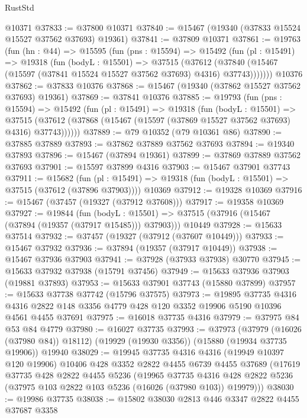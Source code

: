\begin{lexlean}{RustStd}
\begin{coremodule}
    @10371
@37833 := @37800 @10371
@37840 := @15467 (@19340 (@37833 @15524 @15527 @37562 @37693) @19361)
@37841 := @37809 @10371
@37861 := @19763
    (fun (hn : @44) =>
    @15595
      (fun (pns : @15594) =>
      @15492
        (fun (pl : @15491) =>
        @19318
          (fun (bodyL : @15501) =>
          @37515
            (@37612
              (@37840 (@15467 (@15597 (@37841 @15524 @15527 @37562 @37693) @4316) @37743)))))))
    @10376
@37862 := @37833 @10376
@37868 := @15467 (@19340 (@37862 @15527 @37562 @37693) @19361)
@37869 := @37841 @10376
@37885 := @19793
    (fun (pns : @15594) =>
    @15492
      (fun (pl : @15491) =>
      @19318
        (fun (bodyL : @15501) =>
        @37515 (@37612 (@37868 (@15467 (@15597 (@37869 @15527 @37562 @37693) @4316) @37743))))))
@37889 := @79 @10352 (@79 @10361 @86)
@37890 := @37885 @37889
@37893 := @37862 @37889 @37562 @37693
@37894 := @19340 @37893
@37896 := @15467 (@37894 @19361)
@37899 := @37869 @37889 @37562 @37693
@37901 := @15597 @37899 @4316
@37903 := @15467 @37901 @37743
@37911 := @15682
    (fun (pl : @15491) => @19318 (fun (bodyL : @15501) => @37515 (@37612 (@37896 @37903))))
    @10369
@37912 := @19328 @10369
@37916 := @15467 (@37457 (@19327 (@37912 @37608)))
@37917 := @19358 @10369
@37927 := @19844
    (fun (bodyL : @15501) => @37515 (@37916 (@15467 (@37894 (@19357 (@37917 @15485))) @37903)))
    @10449
@37928 := @15633 @37514
@37932 := @37457 (@19327 (@37912 (@37607 @10449)))
@37933 := @15467 @37932
@37936 := @37894 (@19357 (@37917 @10449))
@37938 := @15467 @37936 @37903
@37941 := @37928 (@37933 @37938) @30770
@37945 := @15633 @37932 @37938 (@15791 @37456)
@37949 := @15633 @37936 @37903 (@19881 @37893)
@37953 := @15633 @37901 @37743 (@15880 @37899)
@37957 := @15633 @37738 @37742 (@15796 @37575)
@37973 := @19895
    @37735
    @4316
    @4316
    @2822
    @148
    @3356
    @4779
    @428
    @120
    @3352
    @19906
    @5190
    @10396
    @4561
    @4455
    @37691
@37975 := @16018 @37735 @4316
@37979 := @37975 @84 @53 @84 @4779
@37980 := @16027 @37735
@37993 := @37973
    (@37979 (@16026 (@37980 @84)) @18112)
    (@19929 (@19930 @3356))
    (@15880 (@19934 @37735 @19906))
    @19940
@38029 := @19945
    @37735
    @4316
    @4316
    (@19949 @10397 @120 @19906)
    @10406
    @428
    @3352
    @2822
    @4455
    @6739
    @4455
    @37689
    (@17619
      @37735
      @428
      @2822
      @4455
      @5236
      (@19965
        @37735
        @4316
        @428
        @2822
        @5236
        (@37975 @103 @2822 @103 @5236 (@16026 (@37980 @103)) @19979)))
@38030 := @19986 @37735
@38038 := @15802 @38030 @2813 @446 @3347 @2822 @4455 @37687 @3358

\end{coremodule}
\end{lexlean}
